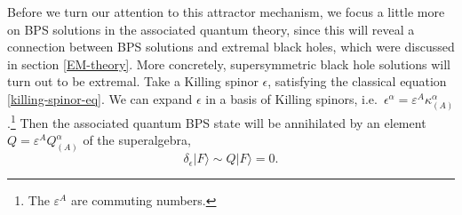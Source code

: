\documentclass[12pt,twoside]{book}
\begin{document}
Before we turn our attention to this attractor mechanism, we focus a little more on BPS solutions in the associated quantum theory, since this will reveal a connection between BPS solutions and extremal black holes, which were discussed in section \ref{EM-theory}. More concretely, supersymmetric black hole solutions will turn out to be extremal. Take a Killing spinor $\epsilon$, satisfying the classical equation \eqref{killing-spinor-eq}. We can expand $\epsilon$ in a basis of Killing spinors, i.e.\ $\epsilon^{\alpha} = \varepsilon^{A}\kappa_{(A)}^{\alpha}$.\footnote{The $\varepsilon^{A}$ are commuting numbers.}
Then the associated quantum BPS state will be annihilated by an element $Q = \varepsilon^{A} Q_{(A)}^{\alpha}$ of the superalgebra,
\begin{equation}
\delta_{\epsilon} | F \rangle \sim Q | F \rangle = 0.
\end{equation}
\end{document}

